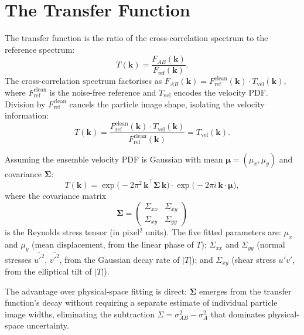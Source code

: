 \documentclass[11pt,a4paper]{article}
\newcommand{\kv}{\mathbf{k}}
\newcommand{\muv}{\bm{\mu}}
\newcommand{\Sigv}{\bm{\Sigma}}
\newcommand{\Fref}{F_\mathrm{ref}}
\newcommand{\Fclean}{F_\mathrm{ref}^\mathrm{clean}}
\begin{document}
\section{The Transfer Function}
\label{sec:transfer}

The transfer function is the ratio of the cross-correlation spectrum to the reference spectrum:
%
\begin{equation}
    T(\kv) = \frac{F_{AB}(\kv)}{\Fref(\kv)}.
    \label{eq:transfer}
\end{equation}
%
The cross-correlation spectrum factorises as $F_{AB}(\kv) = \Fclean(\kv) \cdot T_\mathrm{vel}(\kv)$, where $\Fclean$ is the noise-free reference and $T_\mathrm{vel}$ encodes the velocity PDF.
Division by $\Fclean$ cancels the particle image shape, isolating the velocity information:
%
\begin{equation}
    T(\kv) = \frac{\Fclean(\kv) \cdot T_\mathrm{vel}(\kv)}{\Fclean(\kv)} = T_\mathrm{vel}(\kv).
    \label{eq:cancellation}
\end{equation}

Assuming the ensemble velocity PDF is Gaussian with mean $\muv = (\mu_x, \mu_y)$ and covariance $\Sigv$:
%
\begin{equation}
    T(\kv) = \exp\!\bigl(-2\pi^2\, \kv^\top \Sigv\, \kv\bigr)
    \cdot \exp\!\bigl(-2\pi i\, \kv\cdot\muv\bigr),
    \label{eq:tmodel}
\end{equation}
%
where the covariance matrix
%
\begin{equation}
    \Sigv = \begin{pmatrix} \Sigma_{xx} & \Sigma_{xy} \\ \Sigma_{xy} & \Sigma_{yy} \end{pmatrix}
    \label{eq:sigma}
\end{equation}
%
is the Reynolds stress tensor (in pixel$^2$ units).
The five fitted parameters are: $\mu_x$ and $\mu_y$ (mean displacement, from the linear phase of $T$); $\Sigma_{xx}$ and $\Sigma_{yy}$ (normal stresses $\overline{u'^2}$, $\overline{v'^2}$, from the Gaussian decay rate of $\lvert T\rvert$); and $\Sigma_{xy}$ (shear stress $\overline{u'v'}$, from the elliptical tilt of $\lvert T\rvert$).

The advantage over physical-space fitting is direct: $\Sigv$ emerges from the transfer function's decay without requiring a separate estimate of individual particle image widths, eliminating the subtraction $\Sigma = \sigma_{AB}^2 - \sigma_A^2$ that dominates physical-space uncertainty.
\end{document}
